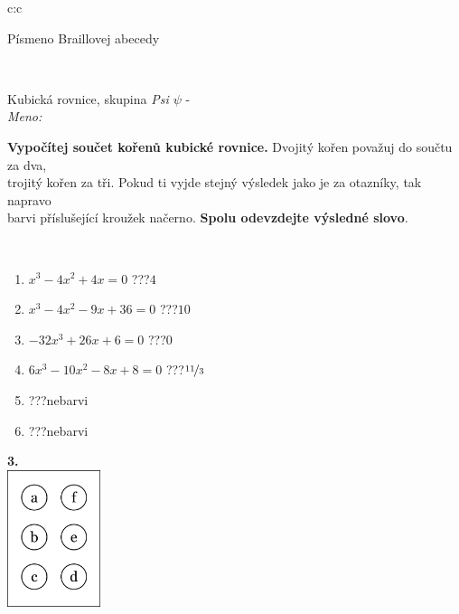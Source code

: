 \documentclass[10pt]{report}
\begin{document}
\begin{tabular}{c:c}
\begin{minipage}[c][104.5mm][t]{0.5\linewidth}
\begin{center}
\begin{minipage}{0.20\linewidth}
\begin{center}
{\small Písmeno Braillovej abecedy}
\end{center}
\end{minipage}
\end{center}
\end{minipage}
\\ \hdashline
\begin{minipage}[c][104.5mm][t]{0.5\linewidth}
\begin{center}
\vspace{7mm}
{\huge Kubická rovnice, skupina \textit{Psi $\psi$} -}\\[5mm]
\textit{Meno:}\phantom{xxxxxxxxxxxxxxxxxxxxxxxxxxxxxxxxxxxxxxxxxxxxxxxxxxxxxxxxxxxxxxxxx}\\[5mm]
\begin{minipage}{0.95\linewidth}
\textbf{Vypočítej součet kořenů kubické rovnice.} Dvojitý kořen považuj do součtu za dva,\\trojitý kořen za tři. Pokud ti vyjde stejný výsledek jako je za otazníky, tak napravo\\barvi příslušející kroužek načerno. \textbf{Spolu odevzdejte výsledné slovo}.
\end{minipage}
\\[1mm]
\begin{minipage}{0.79\linewidth}
\begin{center}
\begin{varwidth}{\linewidth}
\begin{enumerate}
\Large
\item $x^3-4x^2+4x=0$\quad \dotfill\; ???\;\dotfill \quad $4$
\item $x^3-4x^2-9x+36=0$\quad \dotfill\; ???\;\dotfill \quad $10$
\item $-32x^3+26x+6=0$\quad \dotfill\; ???\;\dotfill \quad $0$
\item $6x^3-10x^2-8x+8=0$\quad \dotfill\; ???\;\dotfill \quad $\nicefrac{11}{3}$
\item \quad \dotfill\; ???\;\dotfill \quad nebarvi
\item \quad \dotfill\; ???\;\dotfill \quad nebarvi
\end{enumerate}
\end{varwidth}
\end{center}
\end{minipage}
\begin{minipage}{0.20\linewidth}
\begin{center}
{\Huge\bfseries 3.} \\[2mm]
\includegraphics[height=40mm]{../images/braille.png}

\end{center}
\end{minipage}
\end{center}
\end{minipage}
\end{tabular}
\end{document}
